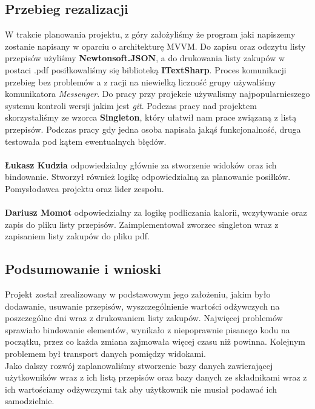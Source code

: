 \documentclass[12pt,a4paper]{article}
\begin{document}
	\subsection*{Przebieg rezalizacji}
	W trakcie planowania projektu, z góry założyliśmy że program jaki napiszemy zostanie napisany w oparciu o architekturę MVVM.
	Do zapisu oraz odczytu listy przepisów użyliśmy \textbf{Newtonsoft.JSON}, a do drukowania listy zakupów w postaci .pdf
	posiłkowaliśmy się biblioteką \textbf{ITextSharp}. Proces komunikacji przebieg bez problemów a z racji na niewielką liczność grupy
	używaliśmy komunikatora \textit{Messenger}. Do pracy przy projekcie używalismy najpopularnieszego systemu kontroli 
	wersji jakim jest \textit{git}. Podczas pracy nad projektem skorzystaliśmy ze wzorca \textbf{Singleton}, który ułatwił nam 
	prace związaną z listą przepisów. Podczas pracy gdy jedna osoba napisała jakąś funkcjonalność, druga testowała pod kątem 
	ewentualnych błędów.\\ \\

	\textbf{Łukasz Kudzia} odpowiedzialny głównie za stworzenie widoków oraz ich bindowanie. Stworzył również logikę 				odpowiedzialną za planowanie posiłków. Pomysłodawca projektu oraz lider zespołu. \\ \\

	\textbf{Dariusz Momot} odpowiedzialny za logikę podliczania kalorii, wczytywanie oraz zapis do pliku listy przepisów.
	Zaimplementował zworzec singleton wraz z zapisaniem listy zakupów do pliku pdf. 

	
	\subsection*{Podsumowanie i wnioski}
	Projekt został zrealizowany w podstawowym jego założeniu, jakim było dodawanie, usuwanie przepisów, wyszczególnienie wartości odżywczych na poszczególne dni wraz z drukowaniem listy zakupów. Najwięcej problemów sprawiało bindowanie elementów, wynikało z niepoprawnie pisanego kodu na początku, przez co każda zmiana zajmowała więcej czasu niż powinna. Kolejnym problemem był transport danych pomiędzy widokami. \\
Jako dalszy rozwój zaplanowaliśmy stworzenie bazy danych zawierającej użytkowników wraz z ich listą przepisów oraz bazy danych ze 
składnikami wraz z ich wartościamy odżywczymi tak aby użytkownik nie musiał podawać ich samodzielnie. \\
	
\end{document}
